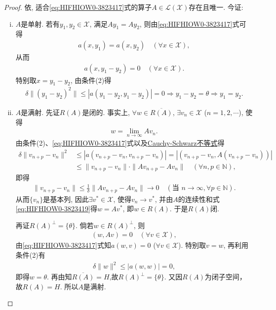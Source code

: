 \documentclass[../../main.tex]{subfiles}%
\begin{document}
\begin{proof}
依, 适合\eqref{eq:HIFHIOW0-3823417}式的算子$A\in\mathscr{L}(\mathscr{X})$存在且唯一. 今证:
\begin{enumerate}[(i)]
\item $A$是单射. 若有$y_1,y_2\in\mathscr{X}$, 满足$Ay_1=Ay_2$, 则由\eqref{eq:HIFHIOW0-3823417}式可得
\begin{align*}
a(x,y_1) = a(x,y_2) \quad (\forall x\in\mathscr{X}),
\end{align*}
从而
\begin{align*}
a(x,y_1 - y_2) = 0 \quad (\forall x\in\mathscr{X}).
\end{align*}
特别取$x=y_1 - y_2$, 由条件(2)得
\begin{align*}
\delta\|(y_1-y_2)^2\|\leqslant |a(y_1 - y_2,y_1 - y_2)|=0\Longrightarrow y_1-y_2=\theta \Longrightarrow y_1=y_2.
\end{align*}

\item $A$是满射. 先证$R(A)$是闭的. 事实上, $\forall w\in\overline{R(A)}$, $\exists v_n\in\mathscr{X}$ ($n=1,2,\cdots$), 使得
\begin{align}
w = \lim_{n\to\infty}Av_n.
\label{eq:HIFHIOW0-3823419}
\end{align}
由条件(2)、\eqref{eq:HIFHIOW0-3823417}式以及\hyperref[theorem:泛函分析--Cauchy-Schwarz不等式]{Cauchy-Schwarz不等式}得
\begin{align*}
\delta\|v_{n+p} - v_n\|^2 &\leqslant |a(v_{n+p} - v_n, v_{n+p} - v_n)| = |(v_{n+p} - v_n, A(v_{n+p} - v_n))| \\
&\leqslant \|v_{n+p} - v_n\| \cdot \|Av_{n+p} - Av_n\| \quad (\forall n,p\in\mathbb{N}),
\end{align*}
即得
\begin{align*}
\|v_{n+p} - v_n\| \leqslant \frac{1}{\delta}\|Av_{n+p} - Av_n\| \to 0 \quad (\text{当 }n\to\infty, \forall p\in\mathbb{N}).
\end{align*}
从而$\{v_n\}$是基本列, 因此$\exists v^*\in\mathscr{X}$, 使得$v_n\to v^*$, 并由$A$的连续性和式\eqref{eq:HIFHIOW0-3823419}得$w=Av^*$, 即$w\in R(A)$. 于是$R(A)$闭.

再证$R(A)^\perp=\{\theta\}$. 倘若$w\in R(A)^\perp$, 则
\begin{align*}
(w,Av) = 0 \quad (\forall v\in\mathscr{X}),
\end{align*}
由\eqref{eq:HIFHIOW0-3823417}式知$a(w,v)=0$ ($\forall v\in\mathscr{X}$). 特别取$v=w$, 再利用条件(2)有
\begin{align*}
\delta\|w\|^2 \leqslant |a(w,w)| = 0,
\end{align*}
即得$w=\theta$. 再由知$\overline{R(A)}=H$,故$R(A)^\perp=\{\theta\}$. 又因$R(A)$为闭子空间，故$R(A)=H$. 所以$A$是满射.


\end{enumerate}
\end{proof}
\end{document}
